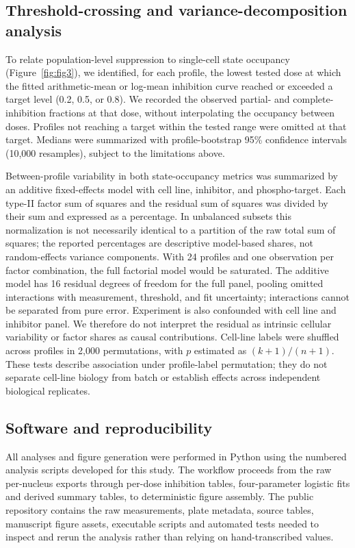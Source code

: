 \documentclass[11pt]{article}
\begin{document}
\subsection*{Threshold-crossing and variance-decomposition analysis}

To relate population-level suppression to single-cell state occupancy (Figure~\ref{fig:fig3}), we identified, for each profile, the lowest tested dose at which the fitted arithmetic-mean or log-mean inhibition curve reached or exceeded a target level (0.2, 0.5, or 0.8). We recorded the observed partial- and complete-inhibition fractions at that dose, without interpolating the occupancy between doses. Profiles not reaching a target within the tested range were omitted at that target. Medians were summarized with profile-bootstrap 95\% confidence intervals (10{,}000 resamples), subject to the limitations above.

Between-profile variability in both state-occupancy metrics was summarized by an additive fixed-effects model with cell line, inhibitor, and phospho-target. Each type-II factor sum of squares and the residual sum of squares was divided by their sum and expressed as a percentage. In unbalanced subsets this normalization is not necessarily identical to a partition of the raw total sum of squares; the reported percentages are descriptive model-based shares, not random-effects variance components. With 24 profiles and one observation per factor combination, the full factorial model would be saturated. The additive model has 16 residual degrees of freedom for the full panel, pooling omitted interactions with measurement, threshold, and fit uncertainty; interactions cannot be separated from pure error. Experiment is also confounded with cell line and inhibitor panel. We therefore do not interpret the residual as intrinsic cellular variability or factor shares as causal contributions. Cell-line labels were shuffled across profiles in 2{,}000 permutations, with $p$ estimated as $(k+1)/(n+1)$. These tests describe association under profile-label permutation; they do not separate cell-line biology from batch or establish effects across independent biological replicates.

\subsection*{Software and reproducibility}

All analyses and figure generation were performed in Python using the numbered analysis scripts developed for this study. The workflow proceeds from the raw per-nucleus exports through per-dose inhibition tables, four-parameter logistic fits and derived summary tables, to deterministic figure assembly. The public repository contains the raw measurements, plate metadata, source tables, manuscript figure assets, executable scripts and automated tests needed to inspect and rerun the analysis rather than relying on hand-transcribed values.
\end{document}
